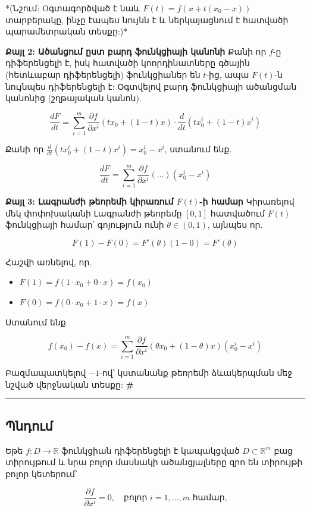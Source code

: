 \documentclass[12pt, a4paper]{article}
\begin{document}
*(Նշում: Oգտագործված է նաև $F(t) = f(x + t(x_0 - x))$ տարբերակը, ինչը էապես նույնն է և ներկայացնում է հատվածի պարամետրական տեսքը:)*

\textbf{Քայլ 2: Ածանցում ըստ բարդ ֆունկցիայի կանոնի}
Քանի որ $f$-ը դիֆերենցելի է, իսկ հատվածի կոորդինատները գծային (հետևաբար դիֆերենցելի) ֆունկցիաներ են $t$-ից, ապա $F(t)$-ն նույնպես դիֆերենցելի է: Օգտվելով բարդ ֆունկցիայի ածանցման կանոնից (շղթայական կանոն).

$$\frac{dF}{dt} = \sum_{i=1}^{m} \frac{\partial f}{\partial x^i} (t x_0 + (1 - t) x) \cdot \frac{d}{dt} (t x_0^i + (1 - t) x^i)$$

Քանի որ $\frac{d}{dt} (t x_0^i + (1 - t) x^i) = x_0^i - x^i$, ստանում ենք.

$$\frac{dF}{dt} = \sum_{i=1}^{m} \frac{\partial f}{\partial x^i} (\dots) (x_0^i - x^i)$$

\textbf{Քայլ 3: Լագրանժի թեորեմի կիրառում $F(t)$-ի համար}
Կիրառելով մեկ փոփոխականի Լագրանժի թեորեմը $[0, 1]$ հատվածում $F(t)$ ֆունկցիայի համար՝ գոյություն ունի $\theta \in (0, 1)$, այնպես որ.

$$F(1) - F(0) = F'(\theta) (1 - 0) = F'(\theta)$$

Հաշվի առնելով, որ.

\begin{itemize}
    \item $F(1) = f(1 \cdot x_0 + 0 \cdot x) = f(x_0)$
    \item $F(0) = f(0 \cdot x_0 + 1 \cdot x) = f(x)$
\end{itemize}

Ստանում ենք.

$$f(x_0) - f(x) = \sum_{i=1}^{m} \frac{\partial f}{\partial x^i} (\theta x_0 + (1 - \theta) x) (x_0^i - x^i)$$

Բազմապատկելով $-1$-ով՝ կստանանք թեորեմի ձևակերպման մեջ նշված վերջնական տեսքը: \textbf{\#}

\vspace{1em}
\hrule
\vspace{1em}

\subsection{Պնդում}

Եթե $f: D \to \mathbb{R}$ ֆունկցիան դիֆերենցելի է կապակցված $D \subset \mathbb{R}^m$ բաց տիրույթում և նրա բոլոր մասնակի ածանցյալները զրո են տիրույթի բոլոր կետերում՝

$$\frac{\partial f}{\partial x^i} = 0, \quad \text{բոլոր } i=1, \dots, m \text{ համար,}$$
\end{document}
